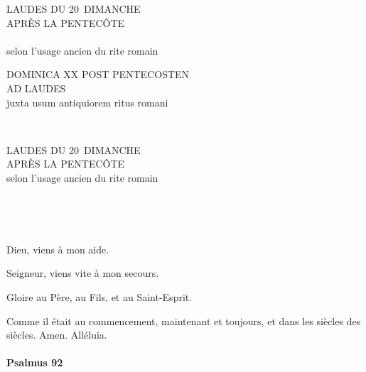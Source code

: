 \documentclass[twoside]{article}
\begin{document}
\null\vfill

\begin{center}\begin{doublespace}
{
\MakeUppercase{\Large Laudes du 20\ieme~dimanche \\ après la Pentecôte}\\~\\
selon l'usage ancien du rite romain
}
\end{doublespace}\end{center}

\vfill\newpage

\sloppy

\begin{paracol}[1]{2}

\begin{center}\begin{doublespace}

{
\MakeUppercase{\Large Dominica XX post Pentecosten \\ ad Laudes}\\
juxta usum antiquiorem ritus romani}
\end{doublespace}\end{center}


~~

\switchcolumn

\begin{center}\begin{doublespace}
{
\MakeUppercase{\Large Laudes du 20\ieme~dimanche \\ après la Pentecôte}\\
selon l'usage ancien du rite romain
}
\end{doublespace}\end{center}

~~

~~

\vv Dieu, viens à mon aide.

\rr Seigneur, viens vite à mon secours.

\vv Gloire au Père, au Fils, et au Saint-Esprit.

\rr Comme il était au commencement, maintenant et toujours, et dans les siècles des siècles. Amen. Alléluia.

\switchcolumn*

\paragraph{Psalmus 92}


\end{paracol}
\end{document}
